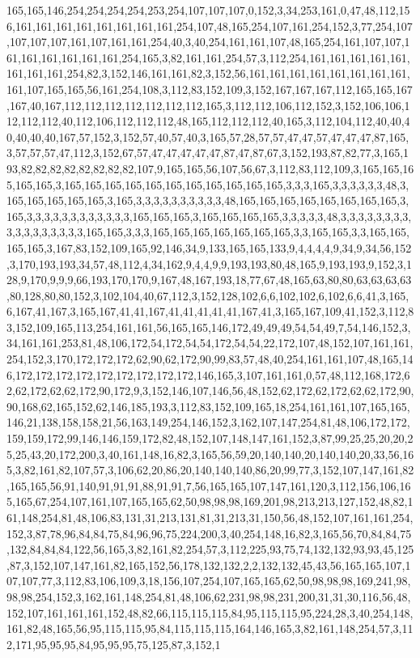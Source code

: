 165,165,146,254,254,254,254,253,254,107,107,107,0,152,3,34,253,161,0,47,48,112,156,161,161,161,161,161,161,161,161,254,107,48,165,254,107,161,254,152,3,77,254,107,107,107,107,161,107,161,161,254,40,3,40,254,161,161,107,48,165,254,161,107,107,161,161,161,161,161,161,254,165,3,82,161,161,254,57,3,112,254,161,161,161,161,161,161,161,161,254,82,3,152,146,161,161,82,3,152,56,161,161,161,161,161,161,161,161,161,107,165,165,56,161,254,108,3,112,83,152,109,3,152,167,167,167,112,165,165,167,167,40,167,112,112,112,112,112,112,112,165,3,112,112,106,112,152,3,152,106,106,112,112,112,40,112,106,112,112,112,48,165,112,112,112,40,165,3,112,104,112,40,40,40,40,40,40,167,57,152,3,152,57,40,57,40,3,165,57,28,57,57,47,47,57,47,47,47,87,165,3,57,57,57,47,112,3,152,67,57,47,47,47,47,47,87,47,87,67,3,152,193,87,82,77,3,165,193,82,82,82,82,82,82,82,82,107,9,165,165,56,107,56,67,3,112,83,112,109,3,165,165,165,165,165,3,165,165,165,165,165,165,165,165,165,165,165,3,3,3,165,3,3,3,3,3,3,48,3,165,165,165,165,165,3,165,3,3,3,3,3,3,3,3,3,3,48,165,165,165,165,165,165,165,165,3,165,3,3,3,3,3,3,3,3,3,3,3,3,165,165,165,3,165,165,165,165,3,3,3,3,3,48,3,3,3,3,3,3,3,3,3,3,3,3,3,3,3,3,3,165,165,3,3,3,165,165,165,165,165,165,165,3,3,165,165,3,3,165,165,165,165,3,167,83,152,109,165,92,146,34,9,133,165,165,133,9,4,4,4,4,9,34,9,34,56,152,3,170,193,193,34,57,48,112,4,34,162,9,4,4,9,9,193,193,80,48,165,9,193,193,9,152,3,128,9,170,9,9,9,66,193,170,170,9,167,48,167,193,18,77,67,48,165,63,80,80,63,63,63,63,80,128,80,80,152,3,102,104,40,67,112,3,152,128,102,6,6,102,102,6,102,6,6,41,3,165,6,167,41,167,3,165,167,41,41,167,41,41,41,41,41,167,41,3,165,167,109,41,152,3,112,83,152,109,165,113,254,161,161,56,165,165,146,172,49,49,49,54,54,49,7,54,146,152,3,34,161,161,253,81,48,106,172,54,172,54,54,172,54,54,22,172,107,48,152,107,161,161,254,152,3,170,172,172,172,62,90,62,172,90,99,83,57,48,40,254,161,161,107,48,165,146,172,172,172,172,172,172,172,172,172,146,165,3,107,161,161,0,57,48,112,168,172,62,62,172,62,62,172,90,172,9,3,152,146,107,146,56,48,152,62,172,62,172,62,62,172,90,90,168,62,165,152,62,146,185,193,3,112,83,152,109,165,18,254,161,161,107,165,165,146,21,138,158,158,21,56,163,149,254,146,152,3,162,107,147,254,81,48,106,172,172,159,159,172,99,146,146,159,172,82,48,152,107,148,147,161,152,3,87,99,25,25,20,20,25,25,43,20,172,200,3,40,161,148,16,82,3,165,56,59,20,140,140,20,140,140,20,33,56,165,3,82,161,82,107,57,3,106,62,20,86,20,140,140,140,86,20,99,77,3,152,107,147,161,82,165,165,56,91,140,91,91,91,88,91,91,7,56,165,165,107,147,161,120,3,112,156,106,165,165,67,254,107,161,107,165,165,62,50,98,98,98,169,201,98,213,213,127,152,48,82,161,148,254,81,48,106,83,131,31,213,131,81,31,213,31,150,56,48,152,107,161,161,254,152,3,87,78,96,84,84,75,84,96,96,75,224,200,3,40,254,148,16,82,3,165,56,70,84,84,75,132,84,84,84,122,56,165,3,82,161,82,254,57,3,112,225,93,75,74,132,132,93,93,45,125,87,3,152,107,147,161,82,165,152,56,178,132,132,2,2,132,132,45,43,56,165,165,107,107,107,77,3,112,83,106,109,3,18,156,107,254,107,165,165,62,50,98,98,98,169,241,98,98,98,254,152,3,162,161,148,254,81,48,106,62,231,98,98,231,200,31,31,30,116,56,48,152,107,161,161,161,152,48,82,66,115,115,115,84,95,115,115,95,224,28,3,40,254,148,161,82,48,165,56,95,115,115,95,84,115,115,115,164,146,165,3,82,161,148,254,57,3,112,171,95,95,95,84,95,95,95,75,125,87,3,152,1